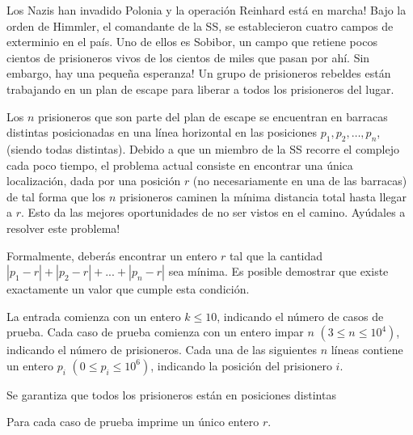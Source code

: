
Los Nazis han invadido Polonia y la operación Reinhard está en marcha! Bajo la orden de Himmler, el comandante de la SS, se establecieron cuatro campos de exterminio en el país. Uno de ellos es Sobibor, un campo que retiene pocos cientos de prisioneros vivos de los cientos de miles que pasan por ahí. Sin embargo, hay una pequeña esperanza! Un grupo de prisioneros rebeldes están trabajando en un plan de escape para liberar a todos los prisioneros del lugar.

Los $n$ prisioneros que son parte del plan de escape se encuentran en barracas distintas posicionadas en una línea horizontal en las posiciones $p_1, p_2, \dots, p_n$, (siendo todas distintas). Debido a que un miembro de la SS recorre el complejo cada poco tiempo, el problema actual consiste en encontrar una única localización, dada por una posición $r$ (no necesariamente en una de las barracas) de tal forma que los $n$ prisioneros caminen la mínima distancia total hasta llegar a $r$. Esto da las mejores oportunidades de no ser vistos en el camino. Ayúdales a resolver este problema!

Formalmente, deberás encontrar un entero $r$ tal que la cantidad $|p_1 - r| + |p_2 - r| + ... + |p_n - r|$ sea mínima. Es posible demostrar que existe exactamente un valor que cumple esta condición.


La entrada comienza con un entero $k \leq 10$, indicando el número de casos de prueba. Cada caso de prueba comienza con un entero impar $n$ $(3 \leq n \leq 10^4)$, indicando el número de prisioneros. Cada una de las siguientes $n$ líneas contiene un entero $p_i$ $(0 \leq p_i \leq 10^6)$, indicando la posición del prisionero $i$.

Se garantiza que todos los prisioneros están en posiciones distintas

\outputText

Para cada caso de prueba imprime un único entero $r$.

\exampleCases

\begin{example}
\end{example}
